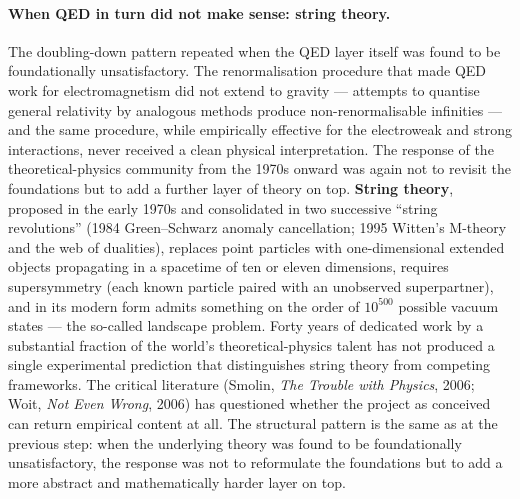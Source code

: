 \paragraph{When QED in turn did not make sense: string theory.}
The doubling-down pattern repeated when the QED layer itself was found to be foundationally unsatisfactory. The renormalisation procedure that made QED work for electromagnetism did not extend to gravity --- attempts to quantise general relativity by analogous methods produce non-renormalisable infinities --- and the same procedure, while empirically effective for the electroweak and strong interactions, never received a clean physical interpretation. The response of the theoretical-physics community from the 1970s onward was again not to revisit the foundations but to add a further layer of theory on top. \textbf{String theory}, proposed in the early 1970s and consolidated in two successive ``string revolutions'' (1984 Green--Schwarz anomaly cancellation; 1995 Witten's M-theory and the web of dualities), replaces point particles with one-dimensional extended objects propagating in a spacetime of ten or eleven dimensions, requires supersymmetry (each known particle paired with an unobserved superpartner), and in its modern form admits something on the order of $10^{500}$ possible vacuum states --- the so-called landscape problem. Forty years of dedicated work by a substantial fraction of the world's theoretical-physics talent has not produced a single experimental prediction that distinguishes string theory from competing frameworks. The critical literature (Smolin, \emph{The Trouble with Physics}, 2006; Woit, \emph{Not Even Wrong}, 2006) has questioned whether the project as conceived can return empirical content at all. The structural pattern is the same as at the previous step: when the underlying theory was found to be foundationally unsatisfactory, the response was not to reformulate the foundations but to add a more abstract and mathematically harder layer on top.


